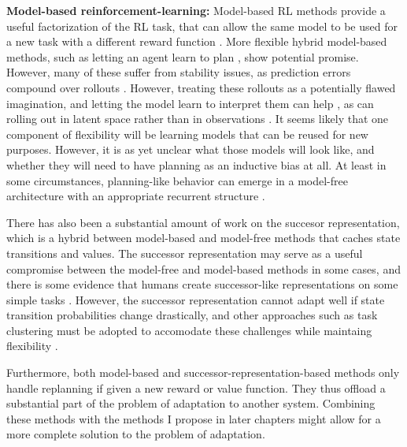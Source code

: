 \textbf{Model-based reinforcement-learning:} Model-based RL methods provide a useful factorization of the RL task, that can allow the same model to be used for a new task with a different reward function \citep[e.g.][]{Laroche2017}. More flexible hybrid model-based methods, such as letting an agent learn to plan \citep{Tamar2017}, show potential promise. However, many of these suffer from stability issues, as prediction errors compound over rollouts \citep{Talvitie2014}. However, treating these rollouts as a potentially flawed imagination, and letting the model learn to interpret them can help \citep{Racaniere2017}, as can rolling out in latent space rather than in observations \citep{Gregor2019}. It seems likely that one component of flexibility will be learning models that can be reused for new purposes. However, it is as yet unclear what those models will look like, and whether they will need to have planning as an inductive bias at all. At least in some circumstances, planning-like behavior can emerge in a model-free architecture with an appropriate recurrent structure \cite{Guez2019}. \par
There has also been a substantial amount of work on the succesor representation, which is a hybrid between model-based and model-free methods that caches state transitions and values. The successor representation may serve as a useful compromise between the model-free and model-based methods in some cases, and there is some evidence that humans create successor-like representations on some simple tasks \citep{Momennejad2017}. However, the successor representation cannot adapt well if state transition probabilities change drastically, and other approaches such as task clustering must be adopted to accomodate these challenges while maintaing flexibility \citep{Madarasz2019}. \par
Furthermore, both model-based and successor-representation-based methods only handle replanning if given a new reward or value function. They thus offload a substantial part of the problem of adaptation to another system. Combining these methods with the methods I propose in later chapters might allow for a more complete solution to the problem of adaptation.\par

